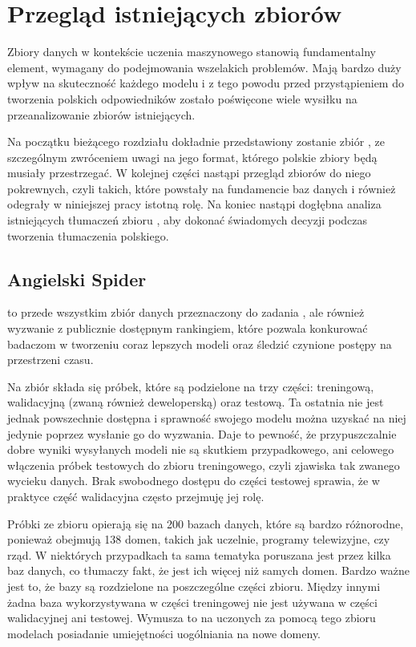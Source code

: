 \chapter{Przegląd istniejących zbiorów}
Zbiory danych w kontekście uczenia maszynowego stanowią fundamentalny element, wymagany do podejmowania wszelakich problemów. Mają bardzo duży wpływ na skuteczność każdego modelu i z tego powodu przed przystąpieniem do tworzenia polskich odpowiedników zostało poświęcone wiele wysiłku na przeanalizowanie zbiorów istniejących.

Na początku bieżącego rozdziału dokładnie przedstawiony zostanie zbiór , ze szczególnym zwróceniem uwagi na jego format, którego polskie zbiory będą musiały przestrzegać. W kolejnej części nastąpi przegląd zbiorów do niego pokrewnych, czyli takich, które powstały na fundamencie baz danych  i również odegrały w niniejszej pracy istotną rolę. Na koniec nastąpi dogłębna analiza istniejących tłumaczeń zbioru , aby dokonać świadomych decyzji podczas tworzenia tłumaczenia polskiego.

\section{Angielski Spider}
 to przede wszystkim zbiór danych przeznaczony do zadania , ale również wyzwanie z publicznie dostępnym rankingiem, które pozwala konkurować badaczom w tworzeniu coraz lepszych modeli oraz śledzić czynione postępy na przestrzeni czasu.

Na zbiór składa się  próbek, które są podzielone na trzy części: treningową, walidacyjną (zwaną również deweloperską) oraz testową. Ta ostatnia nie jest jednak powszechnie dostępna i sprawność swojego modelu można uzyskać na niej jedynie poprzez wysłanie go do wyzwania. Daje to pewność, że przypuszczalnie dobre wyniki wysyłanych modeli nie są skutkiem przypadkowego, ani celowego włączenia próbek testowych do zbioru treningowego, czyli zjawiska tak zwanego wycieku danych. Brak swobodnego dostępu do części testowej sprawia, że w praktyce część walidacyjna często przejmuję jej rolę.

Próbki ze zbioru  opierają się na 200 bazach danych, które są bardzo różnorodne, ponieważ obejmują 138 domen, takich jak uczelnie, programy telewizyjne, czy rząd. W niektórych przypadkach ta sama tematyka poruszana jest przez kilka baz danych, co tłumaczy fakt, że jest ich więcej niż samych domen. Bardzo ważne jest to, że bazy są rozdzielone na poszczególne części zbioru. Między innymi żadna baza wykorzystywana w części treningowej nie jest używana w części walidacyjnej ani testowej. Wymusza to na uczonych za pomocą tego zbioru modelach posiadanie umiejętności uogólniania na nowe domeny.

